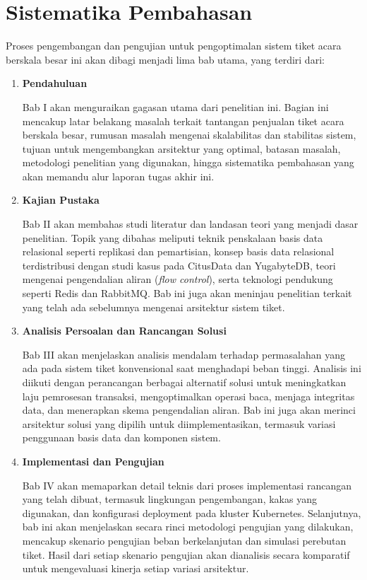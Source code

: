 \section{Sistematika Pembahasan}

Proses pengembangan dan pengujian untuk pengoptimalan sistem tiket acara berskala besar ini akan dibagi menjadi lima bab utama, yang terdiri dari:

\begin{enumerate}
      \item \textbf{Pendahuluan}

            Bab I akan menguraikan gagasan utama dari penelitian ini. Bagian ini mencakup latar belakang masalah terkait tantangan penjualan tiket acara berskala besar, rumusan masalah mengenai skalabilitas dan stabilitas sistem, tujuan untuk mengembangkan arsitektur yang optimal, batasan masalah, metodologi penelitian yang digunakan, hingga sistematika pembahasan yang akan memandu alur laporan tugas akhir ini.

      \item \textbf{Kajian Pustaka}

            Bab II akan membahas studi literatur dan landasan teori yang menjadi dasar penelitian. Topik yang dibahas meliputi teknik penskalaan basis data relasional seperti replikasi dan pemartisian, konsep basis data relasional terdistribusi dengan studi kasus pada CitusData dan YugabyteDB, teori mengenai pengendalian aliran (\textit{flow control}), serta teknologi pendukung seperti Redis dan RabbitMQ. Bab ini juga akan meninjau penelitian terkait yang telah ada sebelumnya mengenai arsitektur sistem tiket.

      \item \textbf{Analisis Persoalan dan Rancangan Solusi}

            Bab III akan menjelaskan analisis mendalam terhadap permasalahan yang ada pada sistem tiket konvensional saat menghadapi beban tinggi. Analisis ini diikuti dengan perancangan berbagai alternatif solusi untuk meningkatkan laju pemrosesan transaksi, mengoptimalkan operasi baca, menjaga integritas data, dan menerapkan skema pengendalian aliran. Bab ini juga akan merinci arsitektur solusi yang dipilih untuk diimplementasikan, termasuk variasi penggunaan basis data dan komponen sistem.

      \item \textbf{Implementasi dan Pengujian}

            Bab IV akan memaparkan detail teknis dari proses implementasi rancangan yang telah dibuat, termasuk lingkungan pengembangan, kakas yang digunakan, dan konfigurasi deployment pada kluster Kubernetes. Selanjutnya, bab ini akan menjelaskan secara rinci metodologi pengujian yang dilakukan, mencakup skenario pengujian beban berkelanjutan dan simulasi perebutan tiket. Hasil dari setiap skenario pengujian akan dianalisis secara komparatif untuk mengevaluasi kinerja setiap variasi arsitektur.


\end{enumerate}
